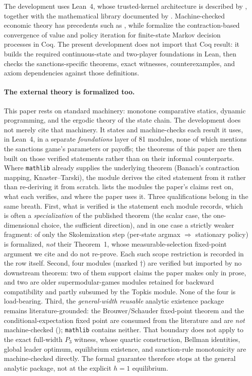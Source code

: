 The development uses Lean~4, whose trusted-kernel architecture is
described by \citet{deMouraEtAl2015}, together with the mathematical
library documented by \citet{MathlibCommunity2020}. Machine-checked
economic theory has precedents such as \citet{Nipkow2009}, while
\citet{VajjhaEtAl2021} formalize the contraction-based convergence of
value and policy iteration for finite-state Markov decision processes
in Coq. The present development does not import that Coq result: it
builds the required continuous-state and two-player foundations in
Lean, then checks the sanctions-specific theorems, exact witnesses,
counterexamples, and axiom dependencies against those definitions.

\paragraph{The external theory is formalized too.} This paper rests on
standard machinery: monotone comparative statics, dynamic programming,
and the ergodic theory of the state chain. The development does not
merely cite that machinery. It states and machine-checks each result it
uses, in Lean~4, in a separate \emph{foundations} layer of 81 modules,
none of which mentions the sanctions game's parameters or payoffs; the
theorems of this paper are then built on those verified statements
rather than on their informal counterparts. Where \texttt{mathlib}
already supplies the underlying theorem (Banach's contraction
mapping, Knaster--Tarski), the module derives the cited statement from
it rather than re-deriving it from scratch.
 lists the modules the paper's claims rest
on, what each verifies, and where the paper uses it. Three qualifications belong in the same
breath. First, what is verified is the statement each module records,
which is often a \emph{specialization} of the published theorem (the
scalar case, the one-dimensional choice, the sufficient direction),
and in one case a strictly weaker fragment: of \citet{HeSun2017} only
the Skolemization step (per-state argmax $\Rightarrow$ stationary
policy) is formalized, \emph{not} their Theorem~1, whose
measurable-selection fixed-point argument we cite and do not re-prove.
Each such scope restriction is recorded in the row itself. Second, four
modules (marked $\dagger$) are verified but imported by no downstream
theorem: two of them support claims the paper makes only in prose, and
two are older supermodular-games modules retained for backward
compatibility and partly subsumed by the Topkis module. None of the
four is load-bearing. Third, the \emph{general-width reusable} analytic
existence package remains literature-grounded: the Brouwer/Schauder
fixed-point theorem and the \citeauthor{HeSun2017}
conditional-expectation fixed point are consumed from the literature
and are \emph{not} machine-checked
(); \texttt{mathlib} contains neither.
That boundary does not apply to the exact full-width $P_3$ witness,
whose quartic construction, Bellman identities, global leader optimum,
equilibrium existence, and sanction-rule monotonicity are
machine-checked directly. The formal guarantee therefore stops at the
general analytic package, not at the explicit $h=1$ equilibrium.

